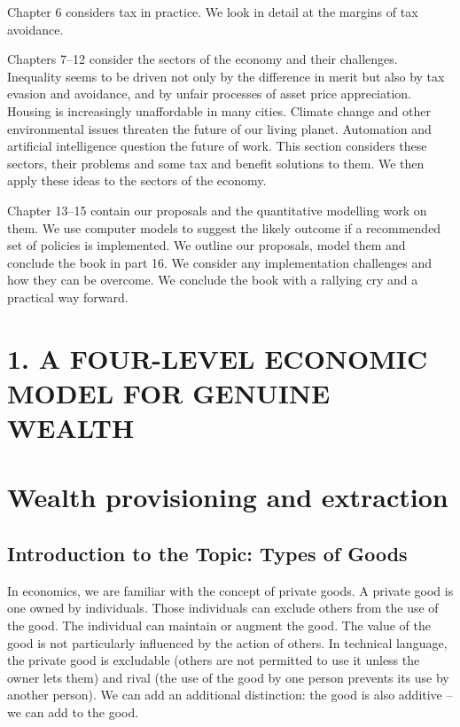 \documentclass[]{tufte-handout}
\begin{document}
Chapter 6 considers tax in practice. We look in detail at the margins of
tax avoidance.

Chapters 7--12 consider the sectors of the economy and their challenges.
Inequality seems to be driven not only by the difference in merit but
also by tax evasion and avoidance, and by unfair processes of asset
price appreciation. Housing is increasingly unaffordable in many cities.
Climate change and other environmental issues threaten the future of our
living planet. Automation and artificial intelligence question the
future of work. This section considers these sectors, their problems and
some tax and benefit solutions to them. We then apply these ideas to the
sectors of the economy.

Chapter 13--15 contain our proposals and the quantitative modelling work
on them. We use computer models to suggest the likely outcome if a
recommended set of policies is implemented. We outline our proposals,
model them and conclude the book in part 16. We consider any
implementation challenges and how they can be overcome. We conclude the
book with a rallying cry and a practical way forward.

\newpage

\hypertarget{a-four-level-economic-model-for-genuine-wealth}{%
\section{1. A FOUR-LEVEL ECONOMIC MODEL FOR GENUINE
WEALTH}\label{a-four-level-economic-model-for-genuine-wealth}}

\hypertarget{wealth-provisioning-and-extraction}{%
\section{Wealth provisioning and
extraction}\label{wealth-provisioning-and-extraction}}

\hypertarget{introduction-to-the-topic-types-of-goods}{%
\subsection{\texorpdfstring{\textbf{Introduction to the Topic: Types of
Goods}}{Introduction to the Topic: Types of Goods}}\label{introduction-to-the-topic-types-of-goods}}

In economics, we are familiar with the concept of private goods. A
private good is one owned by individuals. Those individuals can exclude
others from the use of the good. The individual can maintain or augment
the good. The value of the good is not particularly influenced by the
action of others. In technical language, the private good is excludable
(others are not permitted to use it unless the owner lets them) and
rival (the use of the good by one person prevents its use by another
person). We can add an additional distinction: the good is also additive
-- we can add to the good.
\end{document}
